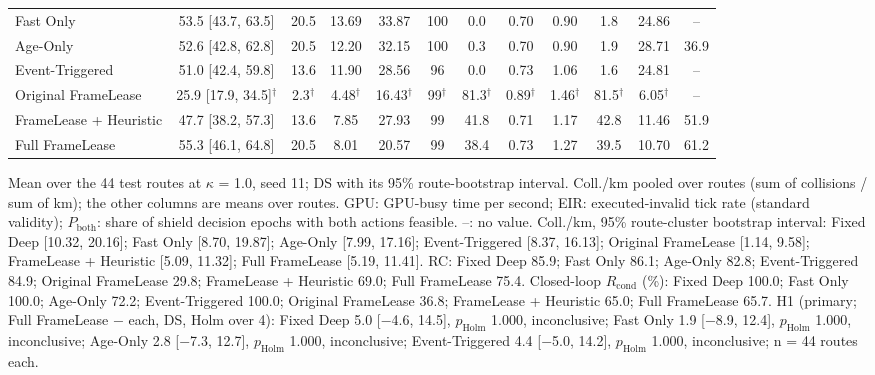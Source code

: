 \begin{table}[t]
\begin{tabular}{lccccccccccc}
Fast Only & 53.5 [43.7, 63.5] & 20.5 & 13.69 & 33.87 & 100 & 0.0 & 0.70 & 0.90 & 1.8 & 24.86 & -- \\
Age-Only & 52.6 [42.8, 62.8] & 20.5 & 12.20 & 32.15 & 100 & 0.3 & 0.70 & 0.90 & 1.9 & 28.71 & 36.9 \\
Event-Triggered & 51.0 [42.4, 59.8] & 13.6 & 11.90 & 28.56 & 96 & 0.0 & 0.73 & 1.06 & 1.6 & 24.81 & -- \\
Original FrameLease & 25.9 [17.9, 34.5]$^\dagger$ & 2.3$^\dagger$ & 4.48$^\dagger$ & 16.43$^\dagger$ & 99$^\dagger$ & 81.3$^\dagger$ & 0.89$^\dagger$ & 1.46$^\dagger$ & 81.5$^\dagger$ & 6.05$^\dagger$ & -- \\
FrameLease + Heuristic & 47.7 [38.2, 57.3] & 13.6 & 7.85 & 27.93 & 99 & 41.8 & 0.71 & 1.17 & 42.8 & 11.46 & 51.9 \\
\midrule
Full FrameLease & 55.3 [46.1, 64.8] & 20.5 & 8.01 & 20.57 & 99 & 38.4 & 0.73 & 1.27 & 39.5 & 10.70 & 61.2 \\
\bottomrule
\end{tabular}
\par\smallskip
\parbox{\textwidth}{\footnotesize
Mean over the 44 test routes at $\kappa$ = 1.0, seed 11; DS with its 95\% route-bootstrap interval. Coll./km pooled over routes (sum of collisions / sum of km); the other columns are means over routes. GPU: GPU-busy time per second; EIR: executed-invalid tick rate (standard validity); $P_\mathrm{both}$: share of shield decision epochs with both actions feasible. --: no value. 
Coll./km, 95\% route-cluster bootstrap interval: Fixed Deep [10.32, 20.16]; Fast Only [8.70, 19.87]; Age-Only [7.99, 17.16]; Event-Triggered [8.37, 16.13]; Original FrameLease [1.14, 9.58]; FrameLease + Heuristic [5.09, 11.32]; Full FrameLease [5.19, 11.41]. 
RC: Fixed Deep 85.9; Fast Only 86.1; Age-Only 82.8; Event-Triggered 84.9; Original FrameLease 29.8; FrameLease + Heuristic 69.0; Full FrameLease 75.4. 
Closed-loop $R_\mathrm{cond}$ (\%): Fixed Deep 100.0; Fast Only 100.0; Age-Only 72.2; Event-Triggered 100.0; Original FrameLease 36.8; FrameLease + Heuristic 65.0; Full FrameLease 65.7. 
H1 (primary; Full FrameLease $-$ each, DS, Holm over 4): Fixed Deep 5.0 [$-$4.6, 14.5], $p_\mathrm{Holm}$ 1.000, inconclusive; Fast Only 1.9 [$-$8.9, 12.4], $p_\mathrm{Holm}$ 1.000, inconclusive; Age-Only 2.8 [$-$7.3, 12.7], $p_\mathrm{Holm}$ 1.000, inconclusive; Event-Triggered 4.4 [$-$5.0, 14.2], $p_\mathrm{Holm}$ 1.000, inconclusive; n = 44 routes each. 
}
\end{table}
